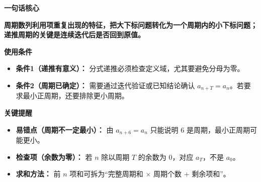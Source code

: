 \begin{summarybox}
	\textbf{\textcolor{CSummary}{一句话核心}}

	\textbf{周期数列利用项重复出现的特征，把大下标问题转化为一个周期内的小下标问题；递推周期的关键是连续迭代后是否回到原值。}

	\medskip
	\textbf{\textcolor{CSummary}{使用条件}}
	\begin{itemize}[leftmargin=*, itemsep=0.5em, topsep=0.4em]
		\item \textbf{条件1（递推有意义）：} 分式递推必须检查定义域，尤其要避免分母为零。
		\item \textbf{条件2（周期已确定）：} 需要通过迭代验证或已知结论确认 \(a_{n+T}=a_n\)。若要求最小正周期，还要排除更小周期。
	\end{itemize}

	\medskip
	\textbf{\textcolor{CSummary}{关键提醒}}
	\begin{itemize}[leftmargin=*, itemsep=0.5em, topsep=0.4em]
		\item \textbf{易错点（周期不一定最小）：} 由 \(a_{n+6}=a_n\) 只能说明 \(6\) 是周期，最小正周期可能更小。
		\item \textbf{检查项（余数为零）：} 若 \(n\) 除以周期 \(T\) 的余数为 \(0\)，对应 \(a_T\)，不是 \(a_0\)。
		\item \textbf{求和方法：} 前 \(n\) 项和可拆为“完整周期和 \(\times\) 周期个数 + 剩余项和”。
	\end{itemize}
\end{summarybox}